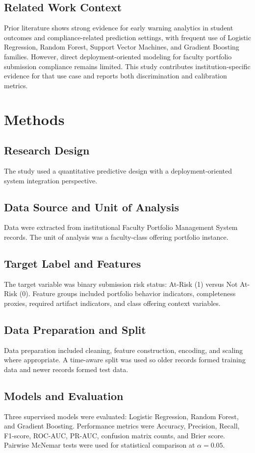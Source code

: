 \documentclass[conference]{IEEEtran}
\begin{document}
\subsection{Related Work Context}
Prior literature shows strong evidence for early warning analytics in student outcomes and compliance-related prediction settings, with frequent use of Logistic Regression, Random Forest, Support Vector Machines, and Gradient Boosting families. However, direct deployment-oriented modeling for faculty portfolio submission compliance remains limited. This study contributes institution-specific evidence for that use case and reports both discrimination and calibration metrics.

\section{Methods}
\subsection{Research Design}
The study used a quantitative predictive design with a deployment-oriented system integration perspective.

\subsection{Data Source and Unit of Analysis}
Data were extracted from institutional Faculty Portfolio Management System records. The unit of analysis was a faculty-class offering portfolio instance.

\subsection{Target Label and Features}
The target variable was binary submission risk status: At-Risk (1) versus Not At-Risk (0). Feature groups included portfolio behavior indicators, completeness proxies, required artifact indicators, and class offering context variables.

\subsection{Data Preparation and Split}
Data preparation included cleaning, feature construction, encoding, and scaling where appropriate. A time-aware split was used so older records formed training data and newer records formed test data.

\subsection{Models and Evaluation}
Three supervised models were evaluated: Logistic Regression, Random Forest, and Gradient Boosting. Performance metrics were Accuracy, Precision, Recall, F1-score, ROC-AUC, PR-AUC, confusion matrix counts, and Brier score. Pairwise McNemar tests were used for statistical comparison at $\alpha=0.05$.
\end{document}
